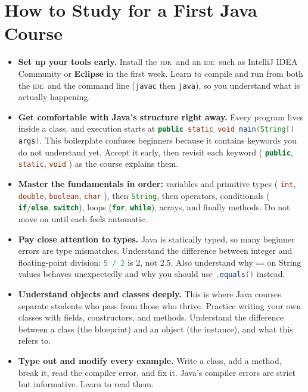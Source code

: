 \documentclass[%
 reprint,
 amsmath,amssymb,
 aps,
]{revtex4-2}
\newcommand{\JDK}{\textsc{jdk}}
\newcommand{\IDE}{\textsc{ide}}
\newcommand{\code}[1]{\lstinline[language=Java]{#1}}
\begin{document}
\section{How to Study for a First Java Course}

	
\begin{itemize}

	\item
	\textbf{Set up your tools early.} 
	Install the \JDK\ and an \IDE\ such as IntelliJ IDEA Community or \textbf{Eclipse} in the first week. 
	Learn to compile and run from both the \IDE\ and the command line 
	(\code{javac} then \code{java}), 
	so you understand what is actually happening.
	
	\item
	\textbf{Get comfortable with Java’s structure right away.} 
	Every program lives inside a class, and execution starts at 
	\code{public static void main(String[] args)}. 
	This boilerplate confuses beginners because it contains keywords you do not understand yet. 
	Accept it early, then revisit each keyword (
	\code{public}, 
	\code{static}, 
	\code{void}
	) as the course explains them.
	
	\item
	\textbf{Master the fundamentals in order:} 
	variables and primitive types (
	\code{int}, 
	\code{double}, 
	\code{boolean}, 
	\code{char}
	), then 
	\code{String}, then operators, 
	conditionals (
	\code{if}/\code{else}, 
	\code{switch}), 
	loops (\code{for}, \code{while}), 
	arrays, and finally methods. 
	Do not move on until each feels automatic.
	
	\item
	\textbf{Pay close attention to types.} 
	Java is statically typed, so many beginner errors are type mismatches. 
	Understand the difference between integer and floating-point division: 
	\code{5 / 2} is 2, not 2.5. 
	Also understand why \code{==} on String values behaves unexpectedly and 
	why you should use 
	\code{.equals()} instead.
	
	\item
	\textbf{Understand objects and classes deeply.} 
	This is where Java courses separate students who pass from those who thrive. 
	Practice writing your own classes with fields, constructors, and methods. 
	Understand the difference between a class (the blueprint) and an object (the instance), and 
	what this refers to.
	
	\item
	\textbf{Type out and modify every example.} 
	Write a class, add a method, break it, read the compiler error, and fix it. 
	Java’s compiler errors are strict but informative. Learn to read them.
	

\end{itemize}
\end{document}
